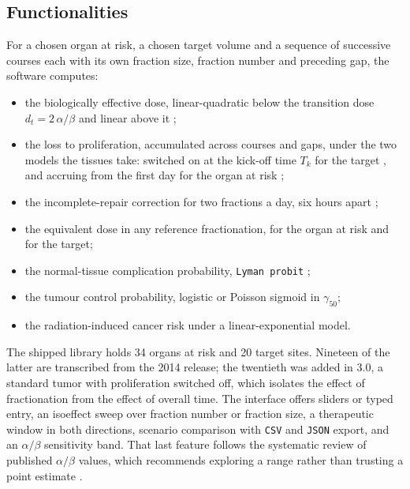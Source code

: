 \documentclass[preprint,12pt,number]{elsarticle}
\begin{document}
\subsection{Functionalities}
For a chosen organ at risk, a chosen target volume and a sequence of successive courses each with its own fraction size, fraction number and preceding gap, the
software computes: 
    \begin{itemize}
      \item the biologically effective dose, linear-quadratic below the transition dose $d_t = 2\,\alpha/\beta$ and linear above it \cite{astrahan2008};
      \item the loss to proliferation, accumulated across courses and gaps, under the two models the tissues take: switched on at the kick-off time $T_k$ for 
            the target \cite{dale1989,withers1988}, and accruing from the first day for the organ at risk \cite{vandyk1989};
      \item the incomplete-repair correction for two fractions a day, six hours apart \cite{thames1985};
      \item the equivalent dose in any reference fractionation, for the organ at risk and for the target;
      \item the normal-tissue complication probability, \texttt{Lyman probit} \cite{lyman1985,burman1991};
      \item the tumour control probability, logistic or Poisson sigmoid in $\gamma_{50}$;
      \item the radiation-induced cancer risk under a linear-exponential model.
    \end{itemize}
The shipped library holds 34 organs at risk and 20 target sites. Nineteen of the latter are transcribed from the 2014 release; the twentieth was added in 3.0, a
standard tumor with proliferation switched off, which isolates the effect of fractionation from the effect of overall time. The interface offers sliders or typed entry, an isoeffect sweep over fraction number or fraction size, a therapeutic window in both directions, scenario comparison with \texttt{CSV} and \texttt{JSON} export, and an $\alpha/\beta$ sensitivity band. That last feature follows the systematic review of published $\alpha/\beta$ values, which recommends exploring a range rather than trusting a point estimate \cite{vanleeuwen2018}.
\end{document}

